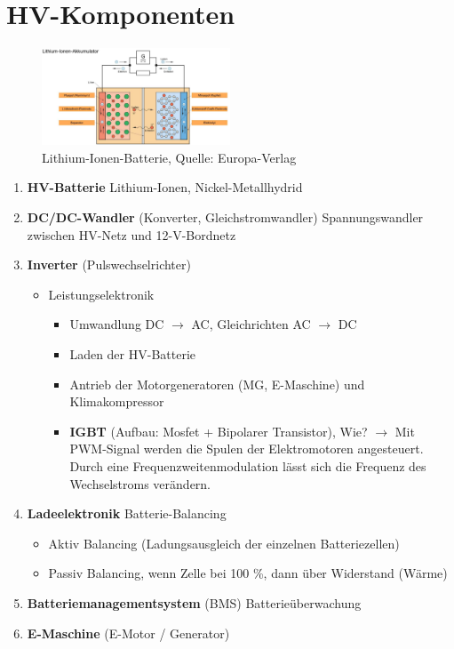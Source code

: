 \newpage

\section{HV-Komponenten}\label{hv-komponenten}

\begin{figure}[!ht]%
\centering
\includegraphics[width=0.5\textwidth]{images/HV/HV-3.pdf}
\caption{Lithium-Ionen-Batterie, Quelle: Europa-Verlag}
\end{figure}

\begin{enumerate}
\item
  \textbf{HV-Batterie} Lithium-Ionen, Nickel-Metallhydrid
\item
  \textbf{DC/DC-Wandler} (Konverter, Gleichstromwandler)
  Spannungswandler zwischen HV-Netz und 12-V-Bordnetz
\item
  \textbf{Inverter} (Pulswechselrichter)

  \begin{itemize}
  \item
    Leistungselektronik

    \begin{itemize}
    \item
      Umwandlung DC $\to$ AC, Gleichrichten AC $\to$ DC
    \item
      Laden der HV-Batterie
    \item
      Antrieb der Motorgeneratoren (MG, E-Maschine) und Klimakompressor
    \item
      \textbf{IGBT} (Aufbau: Mosfet + Bipolarer Transistor), Wie?
      $\to$ Mit PWM-Signal werden die Spulen der Elektromotoren
      angesteuert. Durch eine Frequenzweitenmodulation lässt sich die
      Frequenz des Wechselstroms verändern.
    \end{itemize}
  \end{itemize}
\item
  \textbf{Ladeelektronik} Batterie-Balancing

  \begin{itemize}
  \item
    Aktiv Balancing (Ladungsausgleich der einzelnen Batteriezellen)
  \item
    Passiv Balancing, wenn Zelle bei 100 \%, dann über Widerstand
    (Wärme)
  \end{itemize}
\item
  \textbf{Batteriemanagementsystem} (BMS) Batterieüberwachung
\item
  \textbf{E-Maschine} (E-Motor / Generator)
\end{enumerate}

